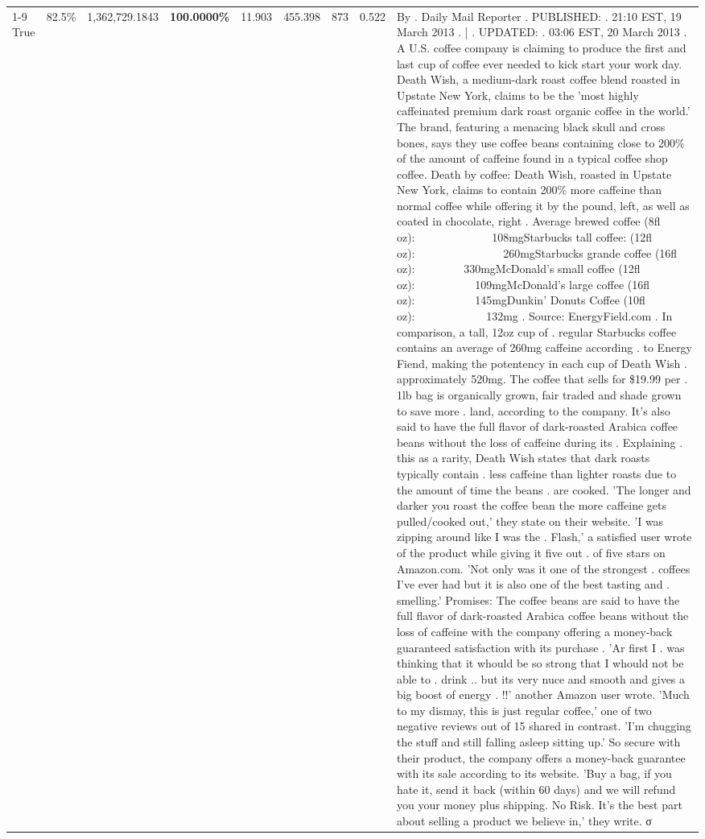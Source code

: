 \begin{table}[H]
{\begin{tabular}{lllrlllll}
\cline{1-9}
True & 82.5\% & 1,362,729.1843 & \bfseries \color{red} 100.0000\% & 11.903 & 455.398 & 873 & 0.522 & By . Daily Mail Reporter . PUBLISHED: . 21:10 EST, 19 March 2013 . | . UPDATED: . 03:06 EST, 20 March 2013 . A U.S. coffee company is claiming to produce the first and last cup of coffee ever needed to kick start your work day. Death Wish, a medium-dark roast coffee blend roasted in Upstate New York, claims to be the 'most highly caffeinated premium dark roast organic coffee in the world.' The brand, featuring a menacing black skull and cross bones, says they use coffee beans containing close to 200\% of the amount of caffeine found in a typical coffee shop coffee. Death by coffee: Death Wish, roasted in Upstate New York, claims to contain 200\% more caffeine than normal coffee while offering it by the pound, left, as well as coated in chocolate, right . Average brewed coffee (8fl oz):              108mgStarbucks tall coffee: (12fl oz):                260mgStarbucks grande coffee (16fl oz):         330mgMcDonald's small coffee (12fl oz):           109mgMcDonald's large coffee (16fl oz):           145mgDunkin' Donuts Coffee (10fl oz):             132mg . Source: EnergyField.com . In comparison, a tall, 12oz cup of . regular Starbucks coffee contains an average of 260mg caffeine according . to Energy Fiend, making the potentency in each cup of Death Wish . approximately 520mg. The coffee that sells for \$19.99 per . 1lb bag is organically grown, fair traded and shade grown to save more . land, according to the company. It's also said to have the full flavor of dark-roasted Arabica coffee beans without the loss of caffeine during its . Explaining . this as a rarity, Death Wish states that dark roasts typically contain . less caffeine than lighter roasts due to the amount of time the beans . are cooked. 'The longer and darker you roast the coffee bean the more caffeine gets pulled/cooked out,' they state on their website. 'I was zipping around like I was the . Flash,' a satisfied user wrote of the product while giving it five out . of five stars on Amazon.com. 'Not only was it one of the strongest . coffees I've ever had but it is also one of the best tasting and . smelling.’ Promises: The coffee beans are said to have the full flavor of dark-roasted Arabica coffee beans without the loss of caffeine with the company offering a money-back guaranteed satisfaction with its purchase . 'Ar first I . was thinking that it whould be so strong that I whould not be able to . drink .. but its very nuce and smooth and gives a big boost of energy . !!' another Amazon user wrote. 'Much to my dismay, this is just regular coffee,' one of two negative reviews out of 15 shared in contrast. 'I'm chugging the stuff and still falling asleep sitting up.' So secure with their product, the company offers a money-back guarantee with its sale according to its website. 'Buy a bag, if you hate it, send it back (within 60 days) and we will refund you your money plus shipping. No Risk. It’s the best part about selling a product we believe in,' they write. σ \\

\end{tabular}}
\end{table}

